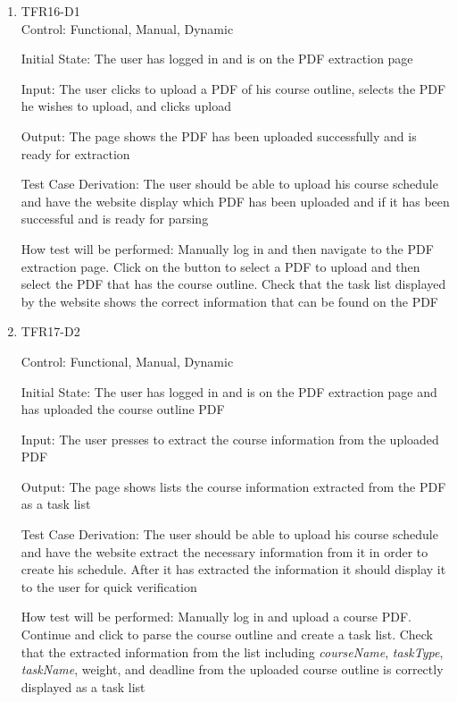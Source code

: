 \documentclass[12pt, titlepage]{article}
\begin{document}
  \begin{enumerate}
  
  \item{TFR16-D1\\}
  Control: Functional, Manual, Dynamic
            
  Initial State: The user has logged in and is on the PDF extraction page
            
  Input: The user clicks to upload a PDF of his course outline, selects the PDF he wishes to upload, and clicks upload
            
  Output: The page shows the PDF has been uploaded successfully and is ready for extraction
  
  Test Case Derivation: The user should be able to upload his course schedule and have the website display which PDF has been uploaded and if it has been successful and is ready for parsing
            
  How test will be performed: Manually log in and then navigate to the PDF extraction page. Click on the button to select a PDF to upload and then select the PDF that has the course outline. Check that the task list displayed by the website shows the correct information that can be found on the PDF
  
  \item{TFR17-D2\\}
  
  Control: Functional, Manual, Dynamic
            
  Initial State: The user has logged in and is on the PDF extraction page and has uploaded the course outline PDF
            
  Input: The user presses to extract the course information from the uploaded PDF
            
  Output: The page shows lists the course information extracted from the PDF as a task list
  
  Test Case Derivation: The user should be able to upload his course schedule and have the website extract the necessary information from it in order to create his schedule. After it has extracted the information it should display it to the user for quick verification
            
  How test will be performed: Manually log in and upload a course PDF. Continue and click to parse the course outline and create a task list. Check that the extracted information from the list including \textit{courseName}, \textit{taskType}, \textit{taskName}, weight, and deadline from the uploaded course outline is correctly displayed as a task list
\end{enumerate}
\end{document}
